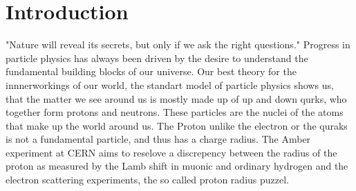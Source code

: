 \chapter{Introduction}
\label{chap:introduction}
"Nature will reveal its secrets, but only if we ask the right questions." \cite{Werner Heisenberg}
\newline
Progress in particle physics has always been driven by the desire to understand the fundamental building blocks of our universe.
\newline Our best theory for the innnerworkings of our world,
the standart model of particle physics shows us, that the matter we see around us is mostly made up of up and down qurks,
who together form protons and neutrons.
These particles are the nuclei of the atoms that make up the world around us. 
 The Proton unlike the electron or the quraks is not a fundamental particle, 
and thus has a charge radius. 
\newline
The Amber experiment at CERN aims to reselove a discrepency between the radius of the proton as measured by the Lamb shift in muonic and ordinary hydrogen and the electron scattering experiments,
the so called proton radius puzzel.
 
